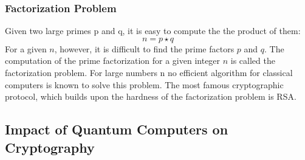 \subsubsection{Factorization Problem}

Given two large primes p and q, it is easy to compute the the product of them:
\begin{equation*}
n = p \star q
\end{equation*}
For a given $n$, however, it is difficult to find the prime factors $p$ and $q$. The computation of the prime factorization for a given integer $n$ is called the factorization problem. \parencite{ITSicherheit} For large numbers n no efficient algorithm for classical computers is known to solve this problem. \parencite{ITSicherheit} The most famous cryptographic protocol, which builds upon the hardness of the factorization problem is RSA.

\subsection{Impact of Quantum Computers on Cryptography}

